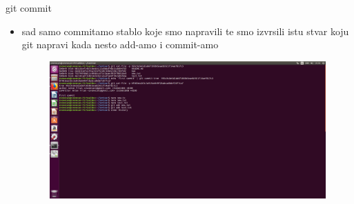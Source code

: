 \documentclass[]{beamer}
\begin{document}
\begin{frame}{git commit}

\begin{itemize}
	\item sad samo commitamo stablo koje smo napravili te smo izvrsili istu stvar koju git napravi kada nesto add-amo i commit-amo
	\begin{figure}
		\centering
	\includegraphics[scale=.48]{./slike/sedma_slika.png}
	\end{figure}
\end{itemize}
\end{frame}
\end{document}
